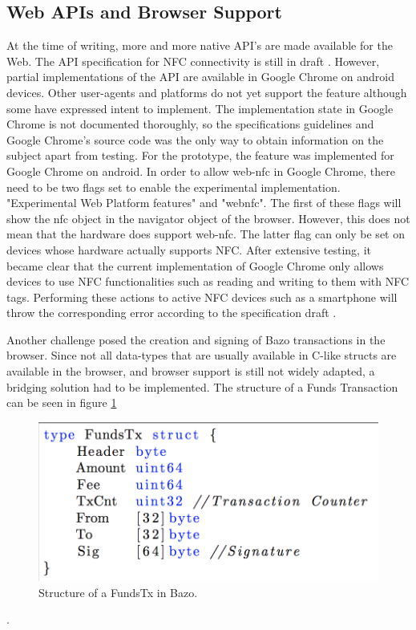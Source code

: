 \subsection{Web APIs and Browser Support}\label{browsersupport}
At the time of writing, more and more native API's are made available for the Web.
The API specification for NFC connectivity is still in draft \cite{webnfc}. However, partial implementations of the API are available in Google Chrome on android devices. Other user-agents and platforms do not yet support the feature although some have expressed intent to implement. The implementation state in Google Chrome is not documented thoroughly, so the specifications guidelines and Google Chrome's source code was the only way to obtain information on the subject apart from testing.
For the prototype, the feature was implemented for Google Chrome on android.
In order to allow web-nfc in Google Chrome, there need to be two flags set to enable the experimental implementation.
"Experimental Web Platform features" and "webnfc". The first of these flags will show the nfc object in the navigator object of the browser. However, this does not mean that the hardware does support web-nfc. The latter flag can only be set on devices whose hardware actually supports NFC.
After extensive testing, it became clear that the current implementation of Google Chrome only allows devices to use NFC functionalities such as reading and writing to them with NFC tags. Performing these actions to active NFC devices such as a smartphone will throw the corresponding error according to the specification draft \cite{webnfc}.

Another challenge posed the creation and signing of Bazo transactions in the browser. Since not all data-types that are usually available in C-like structs are available in the browser, and browser support is still not widely adapted, a bridging solution had to be implemented.
The structure of a Funds Transaction can be seen in figure \ref{fig:FundsTX}

\begin{figure}
\centering
\includegraphics[width=1\textwidth]{diagrams/AccountTx_struct.png}
\caption{\label{fig:FundsTX}Structure of a FundsTx in Bazo.}
\end{figure}.


